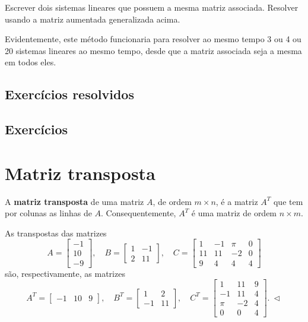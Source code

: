 \begin{exer}
	Escrever dois sistemas lineares que possuem a mesma matriz associada. Resolver usando a matriz aumentada generalizada acima.
\end{exer}

Evidentemente, este método funcionaria para resolver ao mesmo tempo 3 ou 4 ou 20 sistemas lineares ao mesmo tempo, desde que a matriz associada seja a mesma em todos eles.

\subsection*{Exercícios resolvidos}

\construirExeresol

\subsection*{Exercícios}

\construirExer


\section{Matriz transposta}


A \textbf{matriz transposta} de uma matriz $A$, de ordem $m\times n$, é a matriz $A^T$ que tem por colunas as linhas de $A$. Consequentemente, $A^T$ é uma matriz de ordem $n \times m$.

\begin{ex}
	As transpostas das matrizes
	\begin{equation}
	A = \left[
	\begin{array}{c}
	-1  \\
	10  \\
	-9  
	\end{array}
	\right], \quad
	B = \left[
	\begin{array}{cc}
	1 & -1  \\
	2 & 11 
	\end{array}
	\right], \quad
	C = \left[
	\begin{array}{cccc}
	1  & -1 & \pi & 0 \\
	11 & 11 & -2  & 0 \\
	9  & 4  & 4   & 4 
	\end{array}
	\right]
	\end{equation} são, respectivamente, as matrizes
	\begin{equation}
	A^T = \left[
	\begin{array}{ccc}
	-1 & 10 & 9  
	\end{array}
	\right], \quad
	B^T = \left[
	\begin{array}{cc}
	1  & 2  \\
	-1 & 11 
	\end{array}
	\right], \quad
	C^T = \left[
	\begin{array}{ccc}
	1   & 11 & 9 \\
	-1  & 11 & 4 \\
	\pi & -2 & 4 \\
	0  & 0  & 4 
	\end{array}
	\right]. \ \lhd
	\end{equation}
\end{ex}


